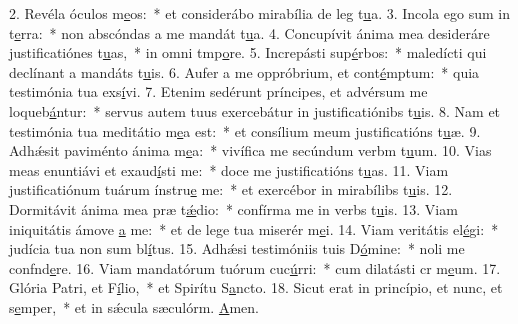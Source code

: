 2. Revéla óculos m\uline{e}os:~* et considerábo mirabília de leg t\uline{u}a.
3. Incola ego sum in t\uline{e}rra:~* non abscóndas a me mandát t\uline{u}a.
4. Concupívit ánima mea desideráre justificatiónes t\uline{u}as,~* in omni tmp\uline{o}re.
5. Increpásti sup\uline{é}rbos:~* maledícti qui declínant a mandáts t\uline{u}is.
6. Aufer a me oppróbrium, et cont\uline{é}mptum:~* quia testimónia tua exs\uline{í}vi.
7. Etenim sedérunt príncipes, et advérsum me loqueb\uline{á}ntur:~* servus autem tuus exercebátur in justificatiónibs t\uline{u}is.
8. Nam et testimónia tua meditátio m\uline{e}a est:~* et consílium meum justificatións t\uline{u}æ.
9. Adhǽsit paviménto ánima m\uline{e}a:~* vivífica me secúndum verbm t\uline{u}um.
10. Vias meas enuntiávi et exaud\uline{í}sti me:~* doce me justificatións t\uline{u}as.
11. Viam justificatiónum tuárum ínstru\uline{e} me:~* et exercébor in mirabílibs t\uline{u}is.
12. Dormitávit ánima mea præ t\uline{ǽ}dio:~* confírma me in verbs t\uline{u}is.
13. Viam iniquitátis ámove \uline{a} me:~* et de lege tua miserér m\uline{e}i.
14. Viam veritátis el\uline{é}gi:~* judícia tua non sum bl\uline{í}tus.
15. Adhǽsi testimóniis tuis D\uline{ó}mine:~* noli me confnd\uline{e}re.
16. Viam mandatórum tuórum cuc\uline{ú}rri:~* cum dilatásti cr m\uline{e}um.
17. Glória Patri, et F\uline{í}lio,~* et Spirítu S\uline{a}ncto.
18. Sicut erat in princípio, et nunc, et s\uline{e}mper,~* et in sǽcula sæculórm. \uline{A}men.
